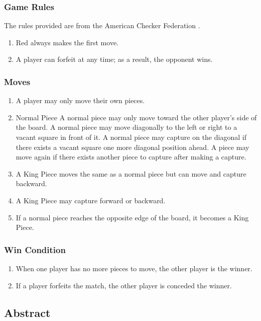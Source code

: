 \documentclass[10pt]{article}
\begin{document}
\subsubsection{Game Rules}
    The rules provided are from the American Checker Federation \cite {checkersFoundation}.
    \begin{enumerate}
    \item Red always makes the first move.
    \item A player can forfeit at any time; as a result, the opponent wins.
    \end{enumerate}
\subsubsection{Moves} 
\begin{enumerate}
    \item A player may only move their own pieces.
    \item Normal Piece
        \subitem A normal piece may only move toward the other player's side of the board.
        \subitem A normal piece may move diagonally to the left or right to a vacant square in front of it.
        \subitem A normal piece may capture on the diagonal if there exists a vacant square one more diagonal position ahead.
            \subsubitem A piece may move again if there exists another piece to capture after making a capture.
    \item A King Piece moves the same as a normal piece but can move and capture backward.
    \item A King Piece may capture forward or backward.
    \item If a normal piece reaches the opposite edge of the board, it becomes a King Piece.
\end{enumerate}   

\subsubsection{Win Condition}
\begin{enumerate}
    \item When one player has no more pieces to move, the other player is the winner.
    \item If a player forfeits the match, the other player is conceded the winner.
\end{enumerate}

\subsection{Abstract}
\end{document}
